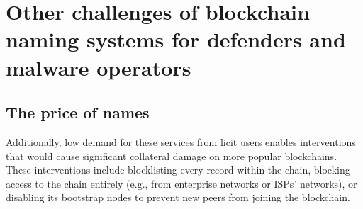 \section{Other challenges of blockchain naming systems for defenders and 
malware operators}
\label{sec:modifying_records}

\subsection{The price of names}

%







Additionally, low demand 
for these services from licit users enables interventions that would cause 
significant collateral damage on more popular blockchains. These interventions 
include blocklisting every record within the chain, blocking access to the 
chain entirely (e.g., from enterprise networks or ISPs' networks), or disabling 
its bootstrap nodes to prevent new peers from joining the blockchain.